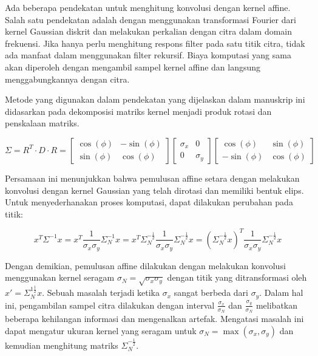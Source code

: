 Ada beberapa pendekatan untuk menghitung konvolusi dengan kernel affine. 
Salah satu pendekatan adalah dengan menggunakan transformasi Fourier dari kernel Gaussian diskrit dan melakukan perkalian dengan citra dalam domain frekuensi. 
Jika hanya perlu menghitung respons filter pada satu titik citra, tidak ada manfaat dalam menggunakan filter rekursif. 
Biaya komputasi yang sama akan diperoleh dengan mengambil sampel kernel affine dan langsung menggabungkannya dengan citra. 

Metode yang digunakan dalam pendekatan yang dijelaskan dalam manuskrip ini didasarkan pada dekomposisi matriks kernel menjadi produk rotasi dan penskalaan matriks.


\begin{equation*}
\Sigma = R^{T} \cdot D \cdot R =  
\begin{bmatrix} 
\cos (\phi )&  -\sin (\phi) \\ 
\sin (\phi )& \cos (\phi) 
\end{bmatrix} 
\begin{bmatrix}
\sigma_{x} &0 \\
0 & \sigma_{y}
\end{bmatrix}
\begin{bmatrix}
\cos (\phi )&  \sin (\phi) \\ 
-\sin (\phi )& \cos (\phi)
\end{bmatrix}
\end{equation*}

Persamaan ini menunjukkan bahwa pemulusan affine setara dengan melakukan konvolusi dengan kernel Gaussian yang telah dirotasi dan memiliki bentuk elips. 
Untuk menyederhanakan proses komputasi, dapat dilakukan perubahan pada titik:

\begin{equation*}
x^{T}\Sigma^{-1}x = x^{T}\frac{1}{\sigma_{x}\sigma_{y}}\Sigma^{-1}_{N}x=x^{T}\Sigma^{-\frac{1}{2}}_{N}\frac{1}{\sigma_{x}\sigma_{y}}\Sigma^{-\frac{1}{2}}_{N}x=(\Sigma^{-\frac{1}{2}}_{N}x)^{T}\frac{1}{\sigma_{x}\sigma_{y}}\Sigma^{-\frac{1}{2}}_{N}x
\end{equation*}

Dengan demikian, pemulusan affine dilakukan dengan melakukan konvolusi menggunakan kernel seragam \(\sigma_{N} = \sqrt{\sigma_{x}\sigma_{y}}\)
dengan titik yang ditransformasi oleh \(x' = \Sigma^{1\frac{1}{2}}_{N}x\). Sebuah masalah terjadi ketika \(\sigma_{x}\) 
sangat berbeda dari \(\sigma_{y}\). Dalam hal ini, pengambilan sampel citra dilakukan dengan interval \(\frac{\sigma_{x}}{\sigma_{N}}\)
dan \(\frac{\sigma_{y}}{\sigma_{N}}\) melibatkan beberapa kehilangan informasi dan mengenalkan artefak. 
Mengatasi masalah ini dapat mengatur ukuran kernel yang seragam untuk \(\sigma_{N} = \max(\sigma_{x},\sigma_{y})\)
dan kemudian menghitung matriks \(\Sigma^{-\frac{1}{2}}_{N}\). 

